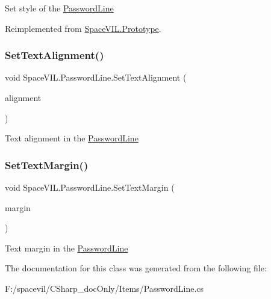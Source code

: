 Set style of the \mbox{\hyperlink{class_space_v_i_l_1_1_password_line}{Password\+Line}} 



Reimplemented from \mbox{\hyperlink{class_space_v_i_l_1_1_prototype_ae96644a6ace490afb376fb542161e541}{Space\+V\+I\+L.\+Prototype}}.

\mbox{\label{class_space_v_i_l_1_1_password_line_a578351e7e63ba70e457e2779fb692c6f}} 
\subsubsection{\texorpdfstring{Set\+Text\+Alignment()}{SetTextAlignment()}}
{\footnotesize\ttfamily void Space\+V\+I\+L.\+Password\+Line.\+Set\+Text\+Alignment (\begin{DoxyParamCaption}\item[{Item\+Alignment}]{alignment }\end{DoxyParamCaption})}



Text alignment in the \mbox{\hyperlink{class_space_v_i_l_1_1_password_line}{Password\+Line}} 

\mbox{\label{class_space_v_i_l_1_1_password_line_affd2b37e2f8bc81d1633b629bae29dfd}} 
\subsubsection{\texorpdfstring{Set\+Text\+Margin()}{SetTextMargin()}}
{\footnotesize\ttfamily void Space\+V\+I\+L.\+Password\+Line.\+Set\+Text\+Margin (\begin{DoxyParamCaption}\item[{\mbox{\hyperlink{struct_space_v_i_l_1_1_decorations_1_1_indents}{Indents}}}]{margin }\end{DoxyParamCaption})}



Text margin in the \mbox{\hyperlink{class_space_v_i_l_1_1_password_line}{Password\+Line}} 



The documentation for this class was generated from the following file\+:\begin{DoxyCompactItemize}
\item 
F\+:/spacevil/\+C\+Sharp\+\_\+doc\+Only/\+Items/Password\+Line.\+cs\end{DoxyCompactItemize}
